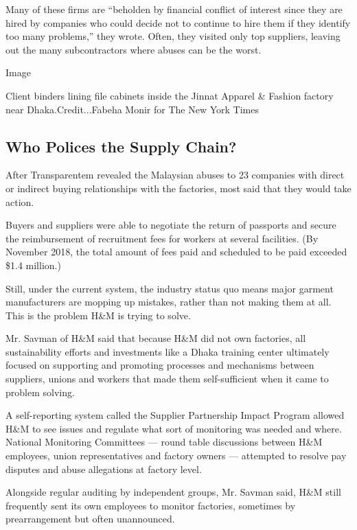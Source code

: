 Many of these firms are ``beholden by financial conflict of interest
since they are hired by companies who could decide not to continue to
hire them if they identify too many problems,'' they wrote. Often, they
visited only top suppliers, leaving out the many subcontractors where
abuses can be the worst.

Image

Client binders lining file cabinets inside the Jinnat Apparel \& Fashion
factory near Dhaka.Credit...Fabeha Monir for The New York Times

\hypertarget{who-polices-the-supply-chain}{%
\subsection{Who Polices the Supply
Chain?}\label{who-polices-the-supply-chain}}

After Transparentem revealed the Malaysian abuses to 23 companies with
direct or indirect buying relationships with the factories, most said
that they would take action.

Buyers and suppliers were able to negotiate the return of passports and
secure the reimbursement of recruitment fees for workers at several
facilities. (By November 2018, the total amount of fees paid and
scheduled to be paid exceeded \$1.4 million.)

Still, under the current system, the industry status quo means major
garment manufacturers are mopping up mistakes, rather than not making
them at all. This is the problem H\&M is trying to solve.

Mr. Savman of H\&M said that because H\&M did not own factories, all
sustainability efforts and investments like a Dhaka training center
ultimately focused on supporting and promoting processes and mechanisms
between suppliers, unions and workers that made them self-sufficient
when it came to problem solving.

A self-reporting system called the Supplier Partnership Impact Program
allowed H\&M to see issues and regulate what sort of monitoring was
needed and where. National Monitoring Committees --- round table
discussions between H\&M employees, union representatives and factory
owners --- attempted to resolve pay disputes and abuse allegations at
factory level.

Alongside regular auditing by independent groups, Mr. Savman said, H\&M
still frequently sent its own employees to monitor factories, sometimes
by prearrangement but often unannounced.

